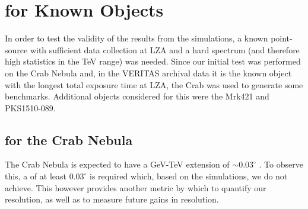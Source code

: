 \documentclass[main.tex]{subfiles}
\begin{document}
\section{\rse for Known Objects}
In order to test the validity of the results from the simulations, a known point-source with sufficient data collection at LZA and a hard spectrum (and therefore high statistics in the TeV range) was needed. Since our initial test was performed on the Crab Nebula and, in the VERITAS archival data it is the known object with the longest total exposure time at LZA, the Crab was used to generate some benchmarks. Additional objects considered for this were the Mrk421 and PKS1510-089.

\subsection{\rse for the Crab Nebula}

The Crab Nebula is expected to have a GeV-TeV extension of $\sim 0.03^\circ$ \cite{Fermi_LAT_Crab_extension}\cite{HESS_Crab_extension}. To observe this, a \rse of at least $0.03^\circ$ is required which, based on the simulations, we do not achieve. This however provides another metric by which to quantify our resolution, as well as to measure future gains in resolution.

\end{document}
